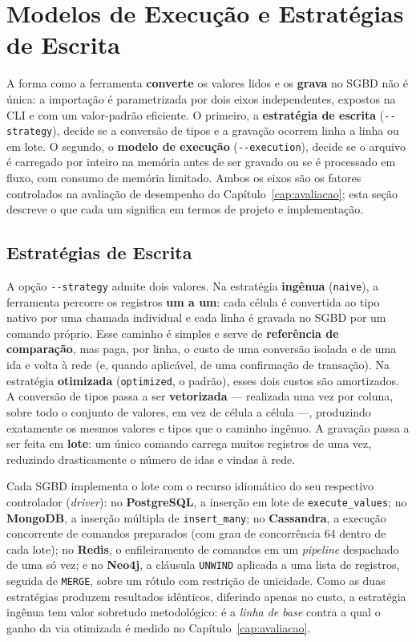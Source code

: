 \section{Modelos de Execução e Estratégias de Escrita}
\label{sec:execucao-estrategias}

A forma como a ferramenta \textbf{converte} os valores lidos e os \textbf{grava} no SGBD
não é única: a importação é parametrizada por dois eixos independentes, expostos na CLI e
com um valor-padrão eficiente. O primeiro, a \textbf{estratégia de escrita}
(\texttt{-{}-strategy}), decide se a conversão de tipos e a gravação ocorrem linha a linha
ou em lote. O segundo, o \textbf{modelo de execução} (\texttt{-{}-execution}), decide se o
arquivo é carregado por inteiro na memória antes de ser gravado ou se é processado em
fluxo, com consumo de memória limitado. Ambos os eixos são os fatores controlados na
avaliação de desempenho do Capítulo~\ref{cap:avaliacao}; esta seção descreve o que cada um
significa em termos de projeto e implementação.

\subsection{Estratégias de Escrita}
\label{sec:estrategias-escrita}

A opção \texttt{-{}-strategy} admite dois valores. Na estratégia \textbf{ingênua}
(\texttt{naive}), a ferramenta percorre os registros \textbf{um a um}: cada célula é
convertida ao tipo nativo por uma chamada individual e cada linha é gravada no SGBD por um
comando próprio. Esse caminho é simples e serve de \textbf{referência de comparação}, mas
paga, por linha, o custo de uma conversão isolada e de uma ida e volta à rede (e, quando
aplicável, de uma confirmação de transação). Na estratégia \textbf{otimizada}
(\texttt{optimized}, o padrão), esses dois custos são amortizados. A conversão de tipos
passa a ser \textbf{vetorizada} --- realizada uma vez por coluna, sobre todo o conjunto de
valores, em vez de célula a célula ---, produzindo exatamente os mesmos valores e tipos que
o caminho ingênuo. A gravação passa a ser feita em \textbf{lote}: um único comando carrega
muitos registros de uma vez, reduzindo drasticamente o número de idas e vindas à rede.

Cada SGBD implementa o lote com o recurso idiomático do seu respectivo controlador
(\textit{driver}): no \textbf{PostgreSQL}, a inserção em lote de \texttt{execute\_values};
no \textbf{MongoDB}, a inserção múltipla de \texttt{insert\_many}; no \textbf{Cassandra}, a
execução concorrente de comandos preparados (com grau de concorrência 64 dentro de cada
lote); no \textbf{Redis}, o enfileiramento de comandos em um \textit{pipeline} despachado
de uma só vez; e no \textbf{Neo4j}, a cláusula \texttt{UNWIND} aplicada a uma lista de
registros, seguida de \texttt{MERGE}, sobre um rótulo com restrição de unicidade. Como as
duas estratégias produzem resultados idênticos, diferindo apenas no custo, a estratégia
ingênua tem valor sobretudo metodológico: é a \textit{linha de base} contra a qual o ganho
da via otimizada é medido no Capítulo~\ref{cap:avaliacao}.

